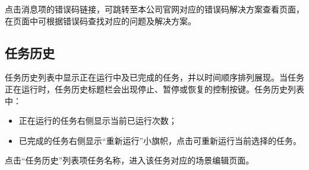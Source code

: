 点击消息项的错误码链接，可跳转至本公司官网对应的错误码解决方案查看页面，在页面中可根据错误码查找对应的问题及解决方案。

\subsection{任务历史}
\label{sec:任务历史}
任务历史列表中显示正在运行中及已完成的任务，并以时间顺序排列展现。当任务正在运行时，任务历史标题栏会出现停止、暂停或恢复的控制按键。任务历史列表中：
\begin{itemize}
	\item 正在运行的任务右侧显示当前已运行次数；
	\item 已完成的任务右侧显示“重新运行”小旗帜，点击可重新运行当前选择的任务。
\end{itemize}

点击“任务历史”列表项任务名称，进入该任务对应的场景编辑页面。


